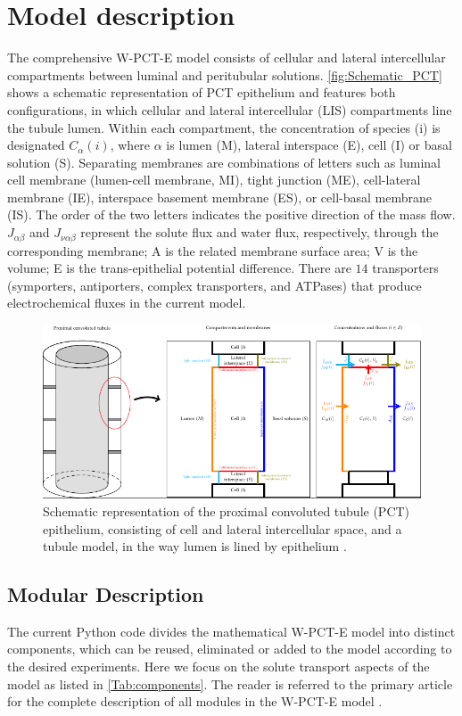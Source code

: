 \documentclass[fleqn,10pt]{physiome}
\begin{document}
\section{Model description}
The comprehensive W-PCT-E model consists of cellular and lateral intercellular compartments between luminal and peritubular solutions. \autoref{fig:Schematic_PCT} shows a schematic representation of PCT epithelium and features both configurations, in which cellular and lateral intercellular (LIS) compartments line the tubule lumen. Within each compartment, the concentration of species (i) is designated $C_{\alpha}(i)$, where ${\alpha}$ is lumen (M), lateral interspace (E), cell (I) or basal solution (S). Separating membranes are combinations of letters such as luminal cell membrane (lumen-cell membrane, MI), tight junction (ME), cell-lateral membrane (IE), interspace basement membrane (ES), or cell-basal membrane (IS). The order of the two letters indicates the positive direction of the mass flow. $J_{\alpha \beta}$ and $J_{\nu \alpha \beta}$ represent the solute flux and water flux, respectively, through the corresponding membrane; A is the related membrane surface area; V is the volume; E is the trans-epithelial potential difference. 
There are $14$ transporters (symporters, antiporters, complex transporters, and ATPases) that produce electrochemical fluxes in the current model.
\begin{figure}
    \centering
    \includegraphics[width=12cm]{Figure2.pdf}
    \caption{Schematic representation of the proximal convoluted tubule (PCT) epithelium, consisting of cell and lateral intercellular space, and a tubule model, in the way lumen is lined by epithelium \cite[Figure 2]{noroozbabaee2022modular}. }
    \label{fig:Schematic_PCT}
\end{figure}

\subsection{Modular Description}
The current Python code divides the mathematical W-PCT-E model into distinct components, which can be reused, eliminated or added to the model according to the desired experiments. Here we focus on the solute transport aspects of the model as listed in \autoref{Tab:components}. The reader is referred to the primary article for the complete description of all modules in the W-PCT-E model \citep{noroozbabaee2022modular}.
\end{document}
